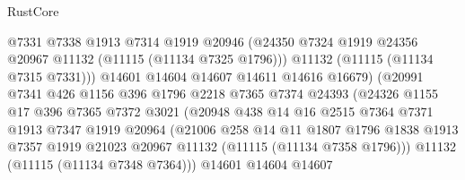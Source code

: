 \begin{lexlean}{RustCore}
\begin{coremodule}
                              @7331
                              @7338
                              @1913
                              @7314
                              @1919
                              @20946
                              (@24350
                                @7324
                                @1919
                                @24356
                                @20967
                                @11132
                                (@11115 (@11134 @7325 @1796)))
                              @11132
                              (@11115 (@11134 @7315 @7331)))
                            @14601
                            @14604
                            @14607
                            @14611
                            @14616
                            @16679)
                          (@20991
                            @7341
                            @426
                            @1156
                            @396
                            @1796
                            @2218
                            @7365
                            @7374
                            @24393
                            (@24326
                              @1155
                              @17
                              @396
                              @7365
                              @7372
                              @3021
                              (@20948
                                @438
                                @14
                                @16
                                @2515
                                @7364
                                @7371
                                @1913
                                @7347
                                @1919
                                @20964
                                (@21006
                                  @258
                                  @14
                                  @11
                                  @1807
                                  @1796
                                  @1838
                                  @1913
                                  @7357
                                  @1919
                                  @21023
                                  @20967
                                  @11132
                                  (@11115 (@11134 @7358 @1796)))
                                @11132
                                (@11115 (@11134 @7348 @7364)))
                              @14601
                              @14604
                              @14607

\end{coremodule}
\end{lexlean}
